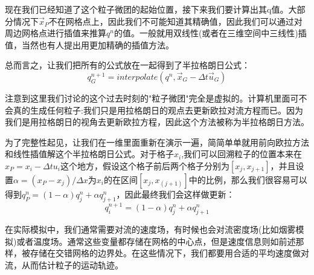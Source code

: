 \documentclass{article}
\begin{document}
\par
现在我们已经知道了这个粒子微团的起始位置，接下来我们要计算出其q值。大部分情况下$\vec{x}_P$不在网格点上，因此我们不可能知道其精确值，因此我们可以通过对周边网格点进行插值来推算$q^n$的值。一般就用双线性(或者在三维空间中三线性)插值，当然也有人提出用更加精确的插值方法。
\par
总而言之，让我们把所有的公式放在一起得到了半拉格朗日公式：
\begin{equation}
q^{n+1}_G=interpolate(q^n,\vec{x}_G-\Delta{t}\vec{u}_G)
\end{equation}
\par
注意到这里我们讨论的这个过去时刻的"粒子微团"完全是虚拟的。计算机里面可不会真的生成任何粒子:我们只是用拉格朗日的观点去更新欧拉对流方程而已。因为我们是用拉格朗日的视角去更新欧拉方程，因此这个方法被称为半拉格朗日方法。
\par
为了完整性起见，让我们在一维里面重新在演示一遍，简简单单就用前向欧拉方法和线性插值解这个半拉格朗日公式。对于格子$x_i$,我们可以回溯粒子的位置本来在$x_P=x_i-\Delta{t}u_i$这个地方，假设这个格子前后两个格子分别为$[x_j,x_{j+1}]$，并且设置$\alpha=(x_P-x_j)/\Delta{x}$为$x_i$的在区间$[x_j,x_(j+1)]$中的比例，那么我们很容易可以得到$q^n_P=(1-\alpha)q^n_j+\alpha{q^n_{j+1}}$，因此最终我们会这样做更新：
\begin{equation}
q_i^{n+1}=(1-\alpha)q^n_j+\alpha q^n_{j+1}
\end{equation}
\par
在实际模拟中，我们通常需要对流的速度场，有时候也会对流密度场(比如烟雾模拟)或者温度场。通常这些变量都存储在网格的中心点，但是速度信息则如前述那样，被存储在交错网格的边界处。在这些情况下，我们都要用合适的平均速度做对流，从而估计粒子的运动轨迹。
\end{document}
